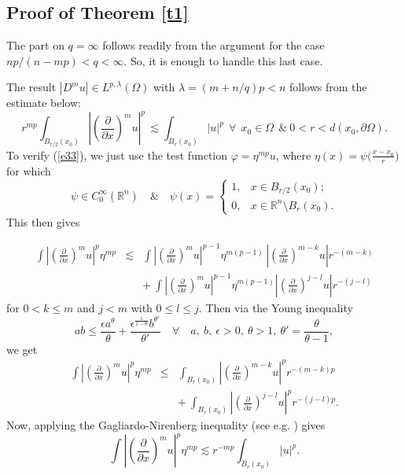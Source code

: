 \documentclass[12pt]{amsart}
\begin{document}
\subsection{Proof of Theorem \ref{t1}} The part on $q=\infty$ follows readily from the argument for the case $np/(n-mp)<q<\infty$. So, it is enough to handle this last case.

The result $|D^m u|\in L^{p,\lambda}(\Omega)$ with $\lambda=(m+n/q)p<n$ follows from the estimate below:
\begin{equation}\label{e33}
r^{mp}\int_{B_{r/2}(x_0)} \left|\left(\frac{\partial}{\partial
x}\right)^{m} u\right|^{p}\,\lesssim\int_{B_r(x_0)}|u|^p \ \
\forall\ \ x_0 \in \Omega\ \ \&\  0<r<d(x_0,\partial\Omega).
\end{equation}
To verify (\ref{e33}), we just use the test function $\varphi =
\eta^{mp}u$, where $\eta(x)=\psi\Big(\frac{x - x_0}{r}\Big)$ for which
$$
\psi\in C_0^\infty(\mathbb R^n)\quad\&\quad \psi(x)=\begin{cases} 1, & x\in B_{r/2}(x_0);\\
0, & x\in \mathbb R^n\setminus B_r(x_0).
\end{cases}
$$
This then gives

\begin{eqnarray*}
\int \left|\left(\frac{\partial}{\partial
x}\right)^{m}u\right|^{p}\eta^{mp}
   &\lesssim& \int \left|\left(\frac{\partial}{\partial
x}\right)^{m}u\right|^{p-1}\eta^{m(p-1)} \,
\left|\left(\frac{\partial}{\partial x}\right)^{m -
k}u\right|r^{-(m-k)}\\
&&+\ \int \left|\left(\frac{\partial}{\partial
x}\right)^{m}u\right|^{p-1}\eta^{m(p-1)}\left|\left(\frac{\partial}{\partial
x}\right)^{j - l}u\right|r^{-(j-l)}
\end{eqnarray*}
for $0 < k \leq m$ and $j < m$ with $0 \leq l \leq j$.  Then via the Young
inequality
$$
ab\le \frac{\epsilon a^{\theta}}{\theta}+\frac{\epsilon^{\frac{1}{1-\theta}}b^{\theta'}}
{\theta'}\quad{\forall}\quad a,\ b,\
\epsilon>0,\ \theta>1,\ \theta'=\frac{\theta}{\theta-1},
$$
we get
\begin{eqnarray*}
  \int \left|\left(\frac{\partial}{\partial x}\right)^{m}u\right|^p \eta^{mp}
  &\leq&\int_{B_r(x_0)}\left|\left(\frac{\partial}{\partial
x}\right)^{m-k}u\right|^{p} r^{-(m-k)p}\\
&&+\ \int_{B_r(x_0)}\left|\left(\frac{\partial}{\partial
x}\right)^{j - l}u\right|^{p}r^{-(j-l)p}.
\end{eqnarray*}
Now, applying the Gagliardo-Nirenberg inequality (see e.g.
\cite{F1969}) gives
$$
\int \left|\left(\frac{\partial}{\partial x}\right)^{m}u\right|^{p}
\eta^{mp} \lesssim r^{-mp}\int_{B_r(x_0)}|u|^{p}.
$$
\end{document}
